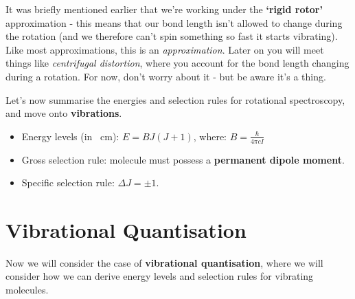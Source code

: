\documentclass{memoir}[11pt,oneside,a4paper,openany]
\newenvironment{myexampleblock}[1]{%
    \tcolorbox[beamer,%
    noparskip,breakable,
    colback=LightGreen,colframe=DarkGreen,%
    colbacklower=LimeGreen!75!LightGreen,%
    title=#1]}%
    {\endtcolorbox}
\begin{document}
It was briefly mentioned earlier that we're working under the \textbf{`rigid rotor'} approximation - this means that our bond length isn't allowed to change during the rotation (and we therefore can't spin something so fast it starts vibrating). Like most approximations, this is an \emph{approximation}. Later on you will meet things like \emph{centrifugal distortion}, where you account for the bond length changing during a rotation. For now, don't worry about it - but be aware it's a thing.

Let's now summarise the energies and selection rules for rotational spectroscopy, and move onto \textbf{vibrations}.
\begin{myexampleblock}{\begin{center}Rotational Spectroscopy\end{center}}
	\begin{center}
		\begin{itemize}
			\item Energy levels (in \si{\per\centi\metre}): $E = BJ(J+1)$, where: $B = \frac{\hbar}{4\pi cI}$
			\item Gross selection rule: molecule must possess a \textbf{permanent dipole moment}.
			\item Specific selection rule: $\Delta J = \pm 1$.
		\end{itemize}
		\end{center}
\end{myexampleblock}

\section{Vibrational Quantisation}
Now we will consider the case of \textbf{vibrational quantisation}, where we will consider how we can derive energy levels and selection rules for vibrating molecules.
\end{document}
